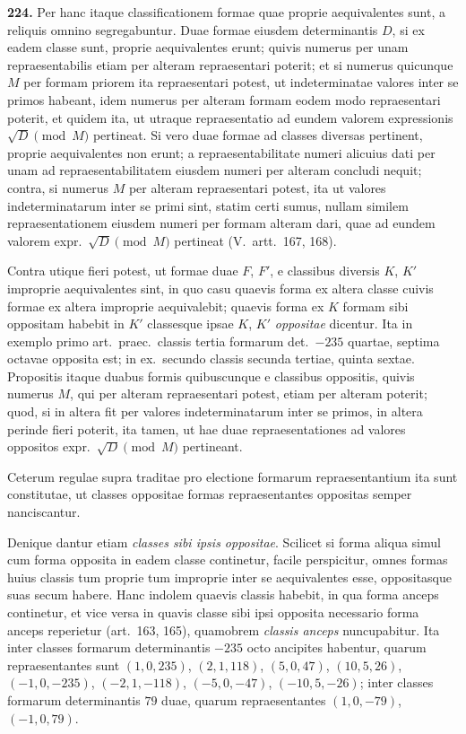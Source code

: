 \documentclass[12pt,a4paper]{article}
\theoremstyle{plain}
\theoremstyle{definition}
\theoremstyle{remark}
\begin{document}
\textbf{224.}
Per hanc itaque classificationem formae quae proprie aequivalentes sunt, a reliquis omnino segregabuntur. Duae formae eiusdem determinantis $D$, si ex eadem classe sunt, proprie aequivalentes erunt; quivis numerus per unam repraesentabilis etiam per alteram repraesentari poterit; et si numerus quicunque $M$ per formam priorem ita repraesentari potest, ut indeterminatae valores inter se primos habeant, idem numerus per alteram formam eodem modo repraesentari poterit, et quidem ita, ut utraque repraesentatio ad eundem valorem expressionis $\sqrt{D}\pmod{M}$ pertineat. Si vero duae formae ad classes diversas pertinent, proprie aequivalentes non erunt; a repraesentabilitate numeri alicuius dati per unam ad repraesentabilitatem eiusdem numeri per alteram concludi nequit; contra, si numerus $M$ per alteram repraesentari potest, ita ut valores indeterminatarum inter se primi sint, statim certi sumus, nullam similem repraesentationem eiusdem numeri per formam alteram dari, quae ad eundem valorem expr.\ $\sqrt{D}\pmod{M}$ pertineat (V.\ artt.\ 167, 168).

Contra utique fieri potest, ut formae duae $F$, $F'$, e classibus diversis $K$, $K'$ improprie aequivalentes sint, in quo casu quaevis forma ex altera classe cuivis formae ex altera improprie aequivalebit; quaevis forma ex $K$ formam sibi oppositam habebit in $K'$ classesque ipsae $K$, $K'$ \emph{oppositae} dicentur. Ita in exemplo primo art.\ praec.\ classis tertia formarum det.\ $-235$ quartae, septima octavae opposita est; in ex.\ secundo classis secunda tertiae, quinta sextae. Propositis itaque duabus formis quibuscunque e classibus oppositis, quivis numerus $M$, qui per alteram repraesentari potest, etiam per alteram poterit; quod, si in altera fit per valores indeterminatarum inter se primos, in altera perinde fieri poterit, ita tamen, ut hae duae repraesentationes ad valores oppositos expr.\ $\sqrt{D}\pmod{M}$ pertineant.

Ceterum regulae supra traditae pro electione formarum repraesentantium ita sunt constitutae, ut classes oppositae formas repraesentantes oppositas semper nanciscantur.

Denique dantur etiam \emph{classes sibi ipsis oppositae}. Scilicet si forma aliqua simul cum forma opposita in eadem classe continetur, facile perspicitur, omnes formas huius classis tum proprie tum improprie inter se aequivalentes esse, oppositasque suas secum habere. Hanc indolem quaevis classis habebit, in qua forma anceps continetur, et vice versa in quavis classe sibi ipsi opposita necessario forma anceps reperietur (art.\ 163, 165), quamobrem \emph{classis anceps} nuncupabitur. Ita inter classes formarum determinantis $-235$ octo ancipites habentur, quarum repraesentantes sunt $(1,0,235)$, $(2,1,118)$, $(5,0,47)$, $(10,5,26)$, $(-1,0,-235)$, $(-2,1,-118)$, $(-5,0,-47)$, $(-10,5,-26)$; inter classes formarum determinantis $79$ duae, quarum repraesentantes $(1,0,-79)$, $(-1,0,79)$.
\end{document}
